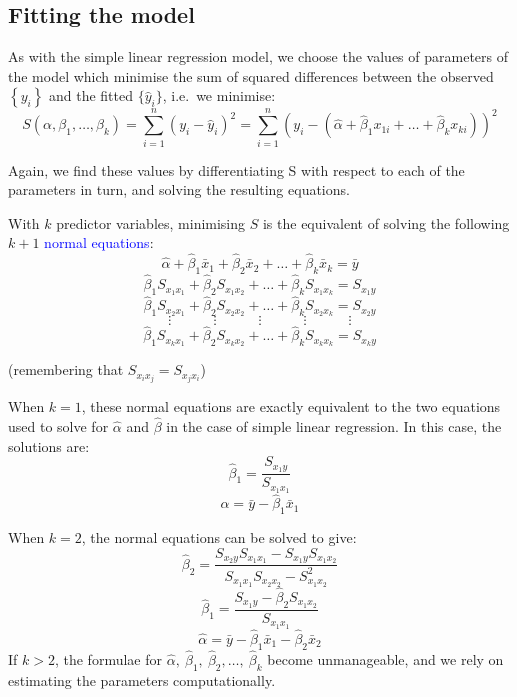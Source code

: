 \documentclass[12pt,a4paper,openany,twoside]{report}
\newcommand{\blue}{\textcolor{blue}}
\newcommand{\emphx}[1]{\blue{#1}}
\theoremstyle{definition}
\theoremstyle{remark}
\theoremstyle{plain}
\theoremstyle{definition}
\theoremstyle{definition}
\theoremstyle{definition}
\theoremstyle{remark}
\begin{document}
\hypertarget{mlrfitting}{%
\subsection{Fitting the model}\label{mlrfitting}}

As with the simple linear regression model, we choose the values of
parameters of the model which minimise the sum of squared differences
between the observed \(\left\{ y_{i} \right\}\) and the fitted
\(\{{\hat{y}}_{i}\}\), i.e.~we minimise:
\[S(\alpha,\beta_1,\ldots,\beta_k) = \sum_{i = 1}^{n}(y_{i} - {\hat{y}}_{i})^{2} = \sum_{i = 1}^{n}\left(y_{i} - \left(\hat{\alpha} + {\hat{\beta}}_{1}x_{1i} + \ldots + {\hat{\beta}}_{k}x_{ki}\right)\right)^{2}\]

Again, we find these values by differentiating S with respect to each of
the parameters in turn, and solving the resulting equations.

With \(k\) predictor variables, minimising \(S\) is the equivalent of solving the
following \(k+1\) \emphx{normal equations}:
\[\tag{n.e. 1} \hat{\alpha} + {\hat{\beta}}_{1}{\bar{x}}_{1} + {\hat{\beta}}_{2}{\bar{x}}_{2} + \ldots + {\hat{\beta}}_{k}{\bar{x}}_{k} = \bar{y}\]
\[\tag{n.e. 2}{\hat{\beta}}_{1}S_{x_{1}x_{1}} + {\hat{\beta}}_{2}S_{x_{1}x_{2}}+\ldots + {\hat{\beta}}_{k}S_{x_{1}x_{k}} = S_{x_{1}y}\]
\[\tag{n.e. 3}{\hat{\beta}}_{1}S_{x_{2}x_{1}} + {\hat{\beta}}_{2}S_{x_{2}x_{2}}+\ldots + {\hat{\beta}}_{k}S_{x_{2}x_{k}} = S_{x_{2}y}\]
\[\vdots \quad \quad \quad \vdots \quad \quad \quad \vdots \quad \quad \quad \vdots \quad \quad \quad \vdots \]
\[\tag{n.e. k+1}{\hat{\beta}}_{1}S_{x_{k}x_{1}} + {\hat{\beta}}_{2}S_{x_{k}x_{2}}+\ldots + {\hat{\beta}}_{k}S_{x_{k}x_{k}} = S_{x_{k}y}\]

(remembering that \(S_{x_{i}x_{j}} = S_{x_{j}x_{i}}\))

When \(k=1\), these normal equations are exactly equivalent to the two
equations used to solve for \(\hat{\alpha}\) and \(\hat{\beta}\) in the
case of simple linear regression. In this case, the solutions are:
\[{\hat{\beta}}_{1} = \frac{S_{x_{1}y}}{S_{x_{1}x_{1}}}\]
\[\hat{\alpha} = \bar{y} - {\hat{\beta}}_{1}{\bar{x}}_{1}\]

When \(k=2\), the normal equations can be solved to give:
\[{\hat{\beta}}_{2} = \frac{S_{x_{2}y}S_{x_{1}x_{1}} - S_{x_{1}y}S_{x_{1}x_{2}}}{S_{x_{1}x_{1}}S_{x_{2}x_{2}} - S_{x_{1}x_{2}}^{2}}\]
\[{\hat{\beta}}_{1} = \frac{S_{x_{1}y} - {\hat{\beta}}_{2}S_{x_{1}x_{2}}}{S_{x_{1}x_{1}}}\]
\[\hat{\alpha} = \bar{y} - {\hat{\beta}}_{1}{\bar{x}}_{1} - {\hat{\beta}}_{2}{\bar{x}}_{2}\]
If \(k > 2\), the formulae for \(\hat{\alpha},\ {\hat{\beta}}_{1},\ {\hat{\beta}}_{2},\ldots,\ {\hat{\beta}}_{k}\)
become unmanageable, and we rely on estimating the parameters
computationally.
\end{document}
